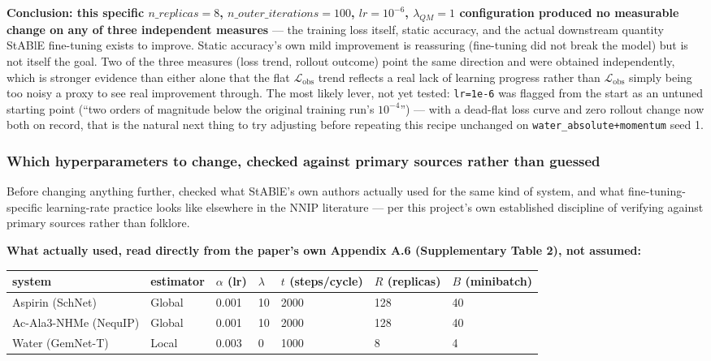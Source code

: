 \documentclass[11pt]{article}
\begin{document}
\textbf{Conclusion: this specific $n\_replicas=8$, $n\_outer\_iterations=100$,
$lr=10^{-6}$, $\lambda_{QM}=1$ configuration produced no measurable change on
any of three independent measures} --- the training loss itself, static
accuracy, and the actual downstream quantity StABlE fine-tuning exists to
improve. Static accuracy's own mild improvement is reassuring (fine-tuning
did not break the model) but is not itself the goal. Two of the three
measures (loss trend, rollout outcome) point the same direction and were
obtained independently, which is stronger evidence than either alone that
the flat $\mathcal{L}_{\text{obs}}$ trend reflects a real lack of learning
progress rather than $\mathcal{L}_{\text{obs}}$ simply being too noisy a
proxy to see real improvement through. The most likely lever, not yet
tested: \texttt{lr=1e-6} was flagged from the start as an untuned starting
point (``two orders of magnitude below the original training run's
$10^{-4}$'') --- with a dead-flat loss curve and zero rollout change now
both on record, that is the natural next thing to try adjusting before
repeating this recipe unchanged on \texttt{water\_absolute+momentum} seed 1.

\subsubsection{Which hyperparameters to change, checked against primary sources rather than guessed}
\label{sec:q4-stable-hparam-lit}

Before changing anything further, checked what StABlE's own authors actually
used for the same kind of system, and what fine-tuning-specific learning-rate
practice looks like elsewhere in the NNIP literature --- per this project's
own established discipline of verifying against primary sources rather than
folklore.

\textbf{What \citet{raja2025stable} actually used, read directly from the
paper's own Appendix A.6 (Supplementary Table 2), not assumed:}

\begin{center}
\begin{tabular}{lllllll}
\toprule
system & estimator & $\alpha$ (lr) & $\lambda$ & $t$ (steps/cycle) & $R$ (replicas) & $B$ (minibatch) \\
\midrule
Aspirin (SchNet) & Global & 0.001 & 10 & 2000 & 128 & 40 \\
Ac-Ala3-NHMe (NequIP) & Global & 0.001 & 10 & 2000 & 128 & 40 \\
Water (GemNet-T) & Local & 0.003 & 0 & 1000 & 8 & 4 \\
\bottomrule
\end{tabular}
\end{center}
\end{document}
